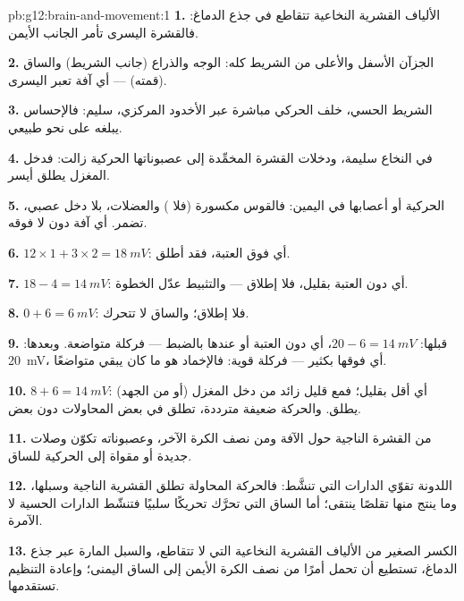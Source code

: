 \begin{solution}{pb:g12:brain-and-movement:1}
\textbf{1.} الألياف القشرية النخاعية تتقاطع في جذع الدماغ: فالقشرة
اليسرى تأمر الجانب الأيمن.

\textbf{2.} الجزآن الأسفل والأعلى من الشريط كله: الوجه والذراع (جانب
الشريط) والساق (قمته) --- أي آفة تعبر  اليسرى.

\textbf{3.} الشريط الحسي، خلف الحركي مباشرة عبر الأخدود المركزي، سليم:
فالإحساس يبلغه على نحو طبيعي.

\textbf{4.}  في النخاع سليمة، ودخلات القشرة المخمِّدة إلى
عصبوناتها الحركية زالت: فدخل المغزل يطلق  أيسر.

\textbf{5.}  الحركية أو أعصابها في اليمين: فالقوس مكسورة (فلا
) والعضلات، بلا دخل عصبي، تضمر. أي آفة دون  لا فوقه.

\textbf{6.} $12 \times 1 + 3 \times 2 = \qty{18}{mV}$: أي فوق العتبة،
فقد أطلق.

\textbf{7.} $18 - 4 = \qty{14}{mV}$: أي دون العتبة بقليل، فلا إطلاق
--- والتثبيط عدّل الخطوة.

\textbf{8.} $0 + 6 = \qty{6}{mV}$: فلا إطلاق؛ والساق لا تتحرك.

\textbf{9.} قبلها: $20 - 6 = \qty{14}{mV}$، أي دون العتبة أو عندها
بالضبط --- فركلة متواضعة. وبعدها: \qty{20}{mV}، أي فوقها بكثير ---
فركلة قوية: فالإخماد هو ما كان يبقي  متواضعًا.

\textbf{10.} $8 + 6 = \qty{14}{mV}$: أي أقل بقليل؛ فمع قليل زائد من
دخل المغزل (أو من الجهد) يطلق. والحركة ضعيفة مترددة، تطلق في بعض
المحاولات دون بعض.

\textbf{11.} من القشرة الناجية حول الآفة ومن نصف الكرة الآخر، وعصبوناته
تكوّن وصلات جديدة أو مقواة إلى  الحركية للساق.

\textbf{12.} اللدونة تقوّي الدارات التي تنشَّط: فالحركة المحاولة تطلق
 القشرية الناجية وسبلها، وما ينتج منها تقلصًا ينتقى؛ أما الساق
التي تحرَّك تحريكًا سلبيًا فتنشّط الدارات الحسية لا الآمرة.

\textbf{13.} الكسر الصغير من الألياف القشرية النخاعية التي لا تتقاطع،
والسبل المارة عبر جذع الدماغ، تستطيع أن تحمل أمرًا من نصف الكرة الأيمن
إلى الساق اليمنى؛ وإعادة التنظيم تستقدمها.


\end{solution}
